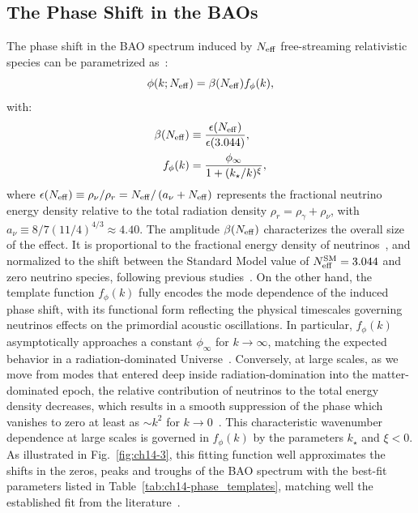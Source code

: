 \subsection{The Phase Shift in the BAOs}
\noindent The phase shift in the BAO spectrum induced by $N_{\rm eff}$ free-streaming relativistic species can be parametrized as~\cite{Baumann:2017gkg,Baumann:2019keh,Green:2020fjb}:
\begin{equation}
    \phi(k; N_{\rm eff})= \beta(N_{\rm eff})f_\phi(k), \label{eq:ch14-dphi}
\end{equation}
with:
\begin{align}
    \beta(N_{\rm eff})&\equiv \frac{\epsilon(N_{\rm eff})}{\epsilon(3.044)},\label{eq:ch14-beta} \\
    f_\phi(k)&=\frac{\phi_{\infty}}{1+(k_\star/k)^\xi},\label{eq:ch14-fphi}
\end{align}
 where $\epsilon(N_{\rm eff})\equiv \rho_\nu/\rho_r=N_{\rm eff}/\left(a_\nu +N_{\rm eff}\right)$ represents the fractional neutrino energy density relative to the total radiation density $\rho_r=\rho_\gamma+\rho_\nu$, with $a_\nu\equiv 8/7\left(11/4\right)^{4/3}\approx 4.40$. The amplitude $\beta(N_{\rm eff})$ characterizes the overall size of the effect. It is proportional to the fractional energy density of neutrinos~\cite{Bashinsky:2003tk, Baumann:2015rya}, and  normalized to the shift between the Standard Model value of $N_{\rm eff}^{\rm SM}=3.044$ and zero neutrino species, following previous studies~\cite{Baumann:2017gkg,Baumann:2019keh}.
 On the other hand, the template function $f_\phi(k)$ fully encodes the mode dependence of the induced phase shift, with its functional form reflecting the physical timescales governing neutrinos effects on the primordial acoustic oscillations. In particular, $f_\phi(k)$ asymptotically approaches a constant $\phi_\infty$ for $k\rightarrow\infty$, matching the expected behavior in a radiation-dominated Universe~\cite{Bashinsky:2003tk,Baumann:2015rya}.  Conversely, at large scales, as we move  from modes that entered deep inside radiation-domination into the matter-dominated epoch, the relative contribution of neutrinos to the total energy density decreases, which results in a smooth suppression of the phase which vanishes to zero at least as $\sim k^2$ for $k \to 0$~\cite{Baumann:2015rya}. This characteristic wavenumber dependence at large scales is governed in $f_\phi(k)$ by the parameters $k_\star$ and $\xi<0$. As
illustrated in Fig.~\ref{fig:ch14-3}, this fitting function well approximates the shifts in the zeros, peaks and troughs of the BAO spectrum with the best-fit parameters listed in Table~\ref{tab:ch14-phase_templates}, matching well the established fit from the literature~\cite{Baumann:2017gkg}.

